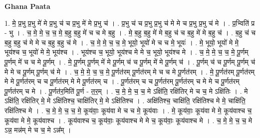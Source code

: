 \documentclass[17pt]{extarticle}
\begin{document}
\textbf{Ghana Paata } \newline

1. मे॒ प्र॒भु प्र॒भु मे॑ मे प्र॒भु च॑ च प्र॒भु मे॑ मे प्र॒भु च॑ । . प्र॒भु च॑ च प्र॒भु प्र॒भु च॑ मे मे च प्र॒भु प्र॒भु च॑ मे । . प्र॒भ्विति॑ प्र - भु । . च॒ मे॒ मे॒ च॒ च॒ मे॒ ब॒हु ब॒हु मे॑ च च मे ब॒हु । . मे॒ ब॒हु ब॒हु मे॑ मे ब॒हु च॑ च ब॒हु मे॑ मे ब॒हु च॑ । . ब॒हु च॑ च ब॒हु ब॒हु च॑ मे मे च ब॒हु ब॒हु च॑ मे । . च॒ मे॒ मे॒ च॒ च॒ मे॒ भूयो॒ भूयो॑ मे च च मे॒ भूयः॑ । . मे॒ भूयो॒ भूयो॑ मे मे॒ भूय॑श्च च॒ भूयो॑ मे मे॒ भूय॑श्च । . भूय॑श्च च॒ भूयो॒ भूय॑श्च मे मे च॒ भूयो॒ भूय॑श्च मे । . च॒ मे॒ मे॒ च॒ च॒ मे॒ पू॒र्णम् पू॒र्णम् मे॑ च च मे पू॒र्णम् । . मे॒ पू॒र्णम् पू॒र्णम् मे॑ मे पू॒र्णम् च॑ च पू॒र्णम् मे॑ मे पू॒र्णम् च॑ । . पू॒र्णम् च॑ च पू॒र्णम् पू॒र्णम् च॑ मे मे च पू॒र्णम् पू॒र्णम् च॑ मे । . च॒ मे॒ मे॒ च॒ च॒ मे॒ पू॒र्णत॑रम् पू॒र्णत॑रम् मे च च मे पू॒र्णत॑रम् । . मे॒ पू॒र्णत॑रम् पू॒र्णत॑रम् मे मे पू॒र्णत॑रम् च च पू॒र्णत॑रम् मे मे पू॒र्णत॑रम् च । . पू॒र्णत॑रम् च च पू॒र्णत॑रम् पू॒र्णत॑रम् च मे मे च पू॒र्णत॑रम् पू॒र्णत॑रम् च मे । . पू॒र्णत॑र॒मिति॑ पू॒र्ण - त॒र॒म् । . च॒ मे॒ मे॒ च॒ च॒ मे ऽक्षि॑ति॒ रक्षि॑तिर् मे च च॒ मे ऽक्षि॑तिः । . मे ऽक्षि॑ति॒ रक्षि॑तिर् मे॒ मे ऽक्षि॑तिश्च॒ चाक्षि॑तिर् मे॒ मे ऽक्षि॑तिश्च । . अक्षि॑तिश्च॒ चाक्षि॑ति॒ रक्षि॑तिश्च मे मे॒ चाक्षि॑ति॒ रक्षि॑तिश्च मे । . च॒ मे॒ मे॒ च॒ च॒ मे॒ कूय॑वाः॒ कूय॑वा मे च च मे॒ कूय॑वाः । . मे॒ कूय॑वाः॒ कूय॑वा मे मे॒ कूय॑वाश्च च॒ कूय॑वा मे मे॒ कूय॑वाश्च । . कूय॑वाश्च च॒ कूय॑वाः॒ कूय॑वाश्च मे मे च॒ कूय॑वाः॒ कूय॑वाश्च मे । . च॒ मे॒ मे॒ च॒ च॒ मे ऽन्न॒ मन्न॑म् मे च च॒ मे ऽन्न᳚म् । \newline
\end{document}

